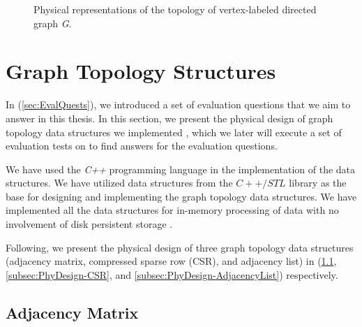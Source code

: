 {\begin{figure}[H]
{        \label{fig:CSR_phy}
    }
\centering
    \caption{Physical representations of the topology of vertex-labeled directed graph \textit{G}.}
    \label{fig:GraphTopology_physical}
\end{figure}


\section{Graph Topology Structures}
\label{sec:PhyDesign-GraphTopology}

In (\ref{sec:EvalQuests}), we introduced a set of evaluation questions that we aim to answer in this thesis. In this section, we present the physical design of graph topology data structures we implemented , which we later will execute a set of evaluation tests on to find answers for the evaluation questions.

We have used the \textit{C++} programming language in the implementation of the data structures. We have utilized data structures from the $C++/STL$ library as the base for designing and implementing the graph topology data structures. We have implemented all the data structures for in-memory processing of data with no involvement of disk persistent storage \cite{josuttis2012c++}.

Following, we present the physical design of three graph topology data structures (adjacency matrix, compressed sparse row (CSR), and adjacency list) in (\ref{subsec:PhyDesign-AdjacencyMatrix}, \ref{subsec:PhyDesign-CSR}, and \ref{subsec:PhyDesign-AdjacencyList}) respectively.



\subsection{Adjacency Matrix}
\label{subsec:PhyDesign-AdjacencyMatrix}

}
